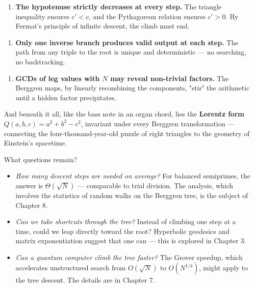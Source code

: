 \documentclass[11pt,openany]{book}
\theoremstyle{definition}
\theoremstyle{plain}
\theoremstyle{remark}
\begin{document}
\begin{enumerate}
\item \textbf{The hypotenuse strictly decreases at every step.} The triangle inequality ensures $c' < c$, and the Pythagorean relation ensures $c' > 0$. By Fermat's principle of infinite descent, the climb must end.
\end{enumerate}

\begin{enumerate}
\item \textbf{Only one inverse branch produces valid output at each step.} The path from any triple to the root is unique and deterministic — no searching, no backtracking.
\end{enumerate}

\begin{enumerate}
\item \textbf{GCDs of leg values with $N$ may reveal non-trivial factors.} The Berggren maps, by linearly recombining the components, "stir" the arithmetic until a hidden factor precipitates.
\end{enumerate}

And beneath it all, like the bass note in an organ chord, lies the \textbf{Lorentz form} $Q(a,b,c) = a^2 + b^2 - c^2$, invariant under every Berggren transformation — connecting the four-thousand-year-old puzzle of right triangles to the geometry of Einstein's spacetime.

What questions remain?

\begin{itemize}
\item \textit{How many descent steps are needed on average?} For balanced semiprimes, the answer is $\Theta(\sqrt{N})$ — comparable to trial division. The analysis, which involves the statistics of random walks on the Berggren tree, is the subject of Chapter 8.
\end{itemize}

\begin{itemize}
\item \textit{Can we take shortcuts through the tree?} Instead of climbing one step at a time, could we leap directly toward the root? Hyperbolic geodesics and matrix exponentiation suggest that one can — this is explored in Chapter 3.
\end{itemize}

\begin{itemize}
\item \textit{Can a quantum computer climb the tree faster?} The Grover speedup, which accelerates unstructured search from $O(\sqrt{N})$ to $O(N^{1/4})$, might apply to the tree descent. The details are in Chapter 7.
\end{itemize}
\end{document}
